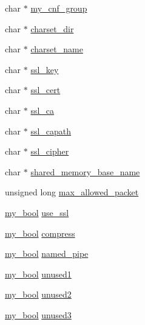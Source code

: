 \begin{DoxyCompactItemize}
\item 
char $\ast$ \hyperlink{structst__mysql__options_a28e998c549cbbc33d7d1eba197f1d52f}{my\+\_\+cnf\+\_\+group}
\item 
char $\ast$ \hyperlink{structst__mysql__options_a8e4ad7ebde4a8956788247faf4da20fb}{charset\+\_\+dir}
\item 
char $\ast$ \hyperlink{structst__mysql__options_a965be4c3b508a911b575fc0aa8fc3345}{charset\+\_\+name}
\item 
char $\ast$ \hyperlink{structst__mysql__options_a43176d9b1d3e5e54ac0b2c263ec4441a}{ssl\+\_\+key}
\item 
char $\ast$ \hyperlink{structst__mysql__options_a4723de8759d3e167f5690fe2abfb98a9}{ssl\+\_\+cert}
\item 
char $\ast$ \hyperlink{structst__mysql__options_a418b114edbc344a140c90df9d1f2cd39}{ssl\+\_\+ca}
\item 
char $\ast$ \hyperlink{structst__mysql__options_a19477c3410299535e086c5fe482f06f4}{ssl\+\_\+capath}
\item 
char $\ast$ \hyperlink{structst__mysql__options_a79dd7a4b9bec6d8d6fb17027dcc49c9e}{ssl\+\_\+cipher}
\item 
char $\ast$ \hyperlink{structst__mysql__options_abd61d3820e3904dd30ad1c4c44887d10}{shared\+\_\+memory\+\_\+base\+\_\+name}
\item 
unsigned long \hyperlink{structst__mysql__options_a70de1a0467629fc3ccb1b0c12431fb41}{max\+\_\+allowed\+\_\+packet}
\item 
\hyperlink{mysql_8h_a74cd599039dcf29c6e6d342cf4efd0a8}{my\+\_\+bool} \hyperlink{structst__mysql__options_a4c429488249a27b52cbd3757e15c17c9}{use\+\_\+ssl}
\item 
\hyperlink{mysql_8h_a74cd599039dcf29c6e6d342cf4efd0a8}{my\+\_\+bool} \hyperlink{structst__mysql__options_ab142434a4e128b82feeebbe6e2dd5e00}{compress}
\item 
\hyperlink{mysql_8h_a74cd599039dcf29c6e6d342cf4efd0a8}{my\+\_\+bool} \hyperlink{structst__mysql__options_ab653028194e8666e5d7d16194f88675e}{named\+\_\+pipe}
\item 
\hyperlink{mysql_8h_a74cd599039dcf29c6e6d342cf4efd0a8}{my\+\_\+bool} \hyperlink{structst__mysql__options_aba1f9319c86456a855b662ae4b8de31a}{unused1}
\item 
\hyperlink{mysql_8h_a74cd599039dcf29c6e6d342cf4efd0a8}{my\+\_\+bool} \hyperlink{structst__mysql__options_addcd685e426bca0f3aca8dbbe1ffe427}{unused2}
\item 
\hyperlink{mysql_8h_a74cd599039dcf29c6e6d342cf4efd0a8}{my\+\_\+bool} \hyperlink{structst__mysql__options_a961daa92001900751dd15073e7dcfb21}{unused3}

\end{DoxyCompactItemize}
